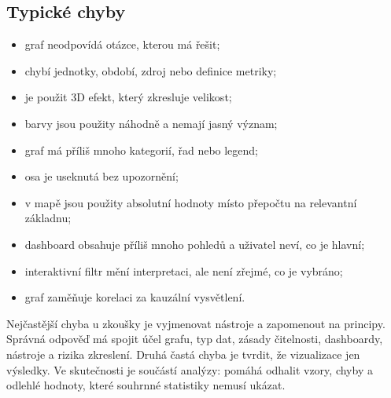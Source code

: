 \subsection{Typické chyby}
\begin{itemize}
  \item graf neodpovídá otázce, kterou má řešit;
  \item chybí jednotky, období, zdroj nebo definice metriky;
  \item je použit 3D efekt, který zkresluje velikost;
  \item barvy jsou použity náhodně a nemají jasný význam;
  \item graf má příliš mnoho kategorií, řad nebo legend;
  \item osa je useknutá bez upozornění;
  \item v mapě jsou použity absolutní hodnoty místo přepočtu na relevantní základnu;
  \item dashboard obsahuje příliš mnoho pohledů a uživatel neví, co je hlavní;
  \item interaktivní filtr mění interpretaci, ale není zřejmé, co je vybráno;
  \item graf zaměňuje korelaci za kauzální vysvětlení.
\end{itemize}

\pozor
Nejčastější chyba u zkoušky je vyjmenovat nástroje a zapomenout na principy. Správná odpověď má
spojit účel grafu, typ dat, zásady čitelnosti, dashboardy, nástroje a rizika zkreslení. Druhá častá
chyba je tvrdit, že vizualizace jen  výsledky. Ve skutečnosti je součástí analýzy:
pomáhá odhalit vzory, chyby a odlehlé hodnoty, které souhrnné statistiky nemusí ukázat.

